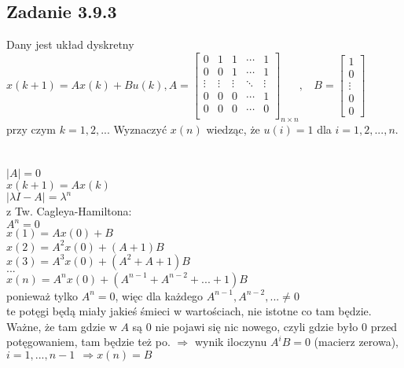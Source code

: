 \subsection*{Zadanie 3.9.3} {\color{darkgray}
	Dany jest układ dyskretny\\
	$x(k+1)=Ax(k)+Bu(k), A=\left[ \begin{array}{ccccc}   
		 0&1&1&\cdots&1 \\
		 0&0&1&\cdots&1  \\
		 \vdots&\vdots&\vdots&\ddots&\vdots  \\
		 0&0&0&\cdots&1  \\
		 0&0&0&\cdots&0  \\
	\end{array}\right]_{n \times n}, \ \ \ \ B=\left[\begin{array}{c}   
		1 \\ 0 \\ \vdots \\ 0 \\ 0
	\end{array}\right]$\\
	przy czym $k=1,2,...$ Wyznaczyć $x(n)$ wiedząc, że $u(i)=1$ dla $i=1,2,...,n$.\\
}\lineh
\\\\
$|A|=0$\\
$x(k+1)=Ax(k)$\\
$|\lambda I -A|=\lambda^n$\\
z Tw. Cagleya-Hamiltona:\\
$A^n=0$\\
$x(1)=Ax(0)+B$\\
$x(2)=A^2x(0)+(A+1)B$\\
$x(3)=A^3x(0)+(A^2+A+1)B$\\
$...$\\
$x(n)=A^nx(0)+(A^{n-1}+A^{n-2}+...+1)B$\\
ponieważ tylko $A^n=0$, więc dla każdego $A^{n-1}, A^{n-2},...\neq0$\\
te potęgi będą miały jakieś śmieci w wartościach, nie istotne co tam będzie. Ważne, że tam gdzie w $A$ są $0$ nie pojawi się nic nowego, czyli gdzie było $0$ przed potęgowaniem, tam będzie też po. $\Rightarrow$ wynik iloczynu $A^iB=0$ (macierz zerowa), $i=1,...,n-1 \ \ \Rightarrow \boxed{x(n)=B}$ 

\pagebreak
